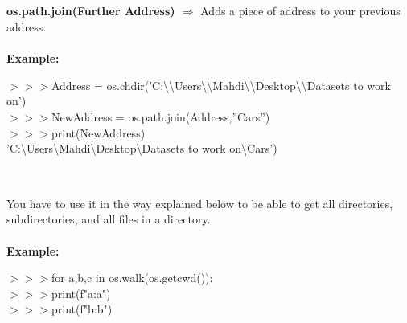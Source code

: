 \documentclass[a4paper,18pt]{article}
\begin{document}

\subsection{\colorbox {matgreen}{\color{white}{\large os.path.join(Further Address)}}}
\textbf{os.path.join(Further Address) $\Rightarrow$} Adds a piece of address to your previous address.\\\\
\textbf{Example:\\}

$>>>$Address = os.chdir('C:\textbackslash\textbackslash Users\textbackslash\textbackslash Mahdi\textbackslash\textbackslash Desktop\textbackslash\textbackslash Datasets to work on')\\

$>>>$NewAddress = os.path.join(Address,''Cars'')\\

$>>>$print(NewAddress)\\

\hspace{14pt} 'C:\textbackslash Users\textbackslash Mahdi\textbackslash Desktop\textbackslash Datasets to work on\textbackslash Cars')\\\\


\subsection{\colorbox {matgreen}{\color{white}{\large os.walk}}}
You have to use it in the way explained below to be able to get all directories, subdirectories, and all files in a directory.\\\\
\textbf{Example:\\}



$>>>$for a,b,c in os.walk(os.getcwd()):\\

$>>>$\hspace*{28pt}print(f"a:{a}")\\

$>>>$\hspace*{28pt}print(f"b:{b}")\\
\end{document}
